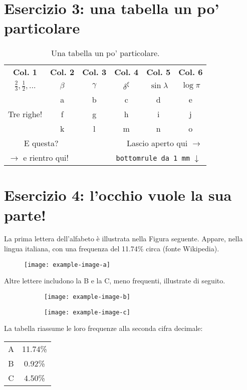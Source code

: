 \documentclass[10pt,a4paper]{article}
\begin{document}
\section{Esercizio 3: una tabella un po' particolare}
\begin{table}[H] 
	\begin{center}
		\begin{tabular}{|c|cc|cc|c|}
			\textbf{Col. 1} & \textbf{Col. 2} & \textbf{Col. 3} & \textbf{Col. 4} & \textbf{Col. 5} & \textbf{Col. 6}\\
			$\frac{2}{3}, \frac{1}{2},...$ & $\beta$ & $\gamma$ & $\delta^\xi$ & $\sin\lambda$ & $\log \pi$\\
			\hline 
			\multirow{3}{*}{Tre righe!} & a & b & c & d & e \\
			& f & g & h & i & j \\
			& k & l & m & n & o \\  %
			\hline
			\multicolumn{2}{|c|}{E questa?} & \multicolumn{4}{r}{Lascio aperto qui $\to$} \\
			\hline
			\multicolumn{3}{l}{$\to$ e rientro qui!} & \multicolumn{3}{c}{\texttt{bottomrule da 1 mm} $\downarrow$}\\
			\bottomrule[0.1cm]
		\end{tabular}
		\caption{Una tabella un po' particolare.}
	\end{center}
\end{table}
\section{Esercizio 4: l'occhio vuole la sua parte!}
\begin{minipage}[t][.3\textheight]{0.49\textwidth}
	La prima lettera dell'alfabeto è illustrata nella Figura seguente. Appare, nella lingua italiana, con una frequenza del 11.74\% circa (fonte Wikipedia).
	\vfill
	\begin{figure}[H]
		\texttt{[image: example-image-a]}
	\end{figure}
\end{minipage} \hfill
\begin{minipage}[t][.3\textheight]{0.49\textwidth}
	Altre lettere includono la B e la C, meno frequenti, illustrate di seguito.
	\begin{figure}[H]
		\begin{subfigure}[t]{0.4\textwidth}
			\texttt{[image: example-image-b]}
		\end{subfigure} \hfill
		\begin{subfigure}[t]{0.4\textwidth}
			\texttt{[image: example-image-c]}
		\end{subfigure}
	\end{figure} \vfill
	La tabella riassume le loro frequenze alla seconda cifra decimale:
	\begin{table}[H]
		\centering
		\begin{tabular}{c|c}
			A & 11.74\% \\
			B & 0.92\% \\
			C & 4.50\% 
		\end{tabular}
	\end{table}
\end{minipage} \\
\end{document}
